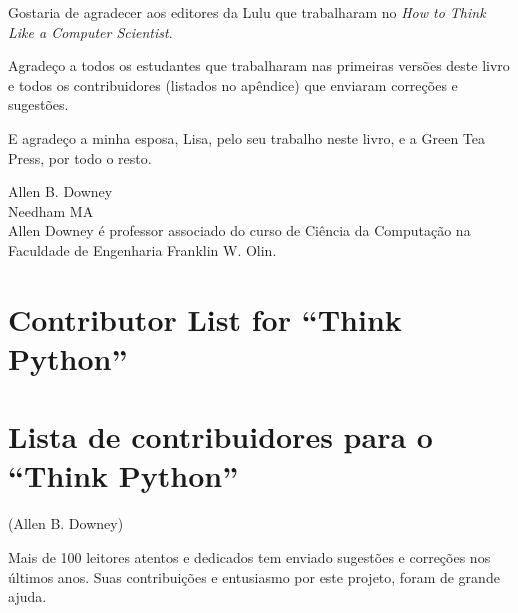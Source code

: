 
Gostaria de agradecer aos editores da Lulu que trabalharam no \emph{How to 
Think Like a Computer Scientist}.


Agradeço a todos os estudantes que trabalharam nas primeiras versões deste 
livro e todos os contribuidores (listados no apêndice) que enviaram correções 
e sugestões.


E agradeço a minha esposa, Lisa, pelo seu trabalho neste livro, e a Green 
Tea Press, por todo o resto.

Allen B. Downey \\
Needham MA\\


Allen Downey é professor associado do curso de Ciência da Computação na 
Faculdade de Engenharia Franklin W. Olin.

\section*{Contributor List for ``Think Python''}
\section*{Lista de contribuidores para o ``Think Python''}


(Allen B. Downey)


Mais de 100 leitores atentos e dedicados tem enviado sugestões e correções 
nos últimos anos. Suas contribuições e entusiasmo por este projeto, foram de 
grande ajuda.


